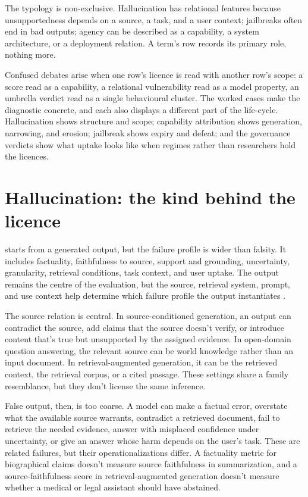 \documentclass[12pt]{article}
\begin{document}
The typology is non-exclusive. Hallucination has relational features because
unsupportedness depends on a source, a task, and a user context; jailbreaks
often end in bad outputs; agency can be described as a capability, a system
architecture, or a deployment relation. A term's row records its primary role,
nothing more.

Confused debates arise when one row's licence is read with another row's
scope: a score read as a capability, a relational vulnerability read as a model
property, an umbrella verdict read as a single behavioural cluster. The worked
cases make the diagnostic concrete, and each also displays a different part of
the life-cycle. Hallucination shows structure and scope; capability
attribution shows generation, narrowing, and erosion; jailbreak shows expiry
and defeat; and
the governance verdicts show what uptake looks like when regimes rather than
researchers hold the licences.

\section{Hallucination: the kind behind the licence}\label{sec:hallucination}

 starts from a generated output, but the failure profile is
wider than falsity. It includes factuality, faithfulness to source, support and
grounding, uncertainty, granularity, retrieval conditions, task context, and user
uptake. The output remains the centre of the evaluation, but the source,
retrieval system, prompt, and use context help determine which failure profile the
output instantiates \citep{ji2023survey,huang2025survey}.

The source relation is central. In source-conditioned generation, an output can
contradict the source, add claims that the source doesn't verify, or introduce
content that's true but unsupported by the assigned evidence. In open-domain
question answering, the relevant source can be world knowledge rather than an
input document. In retrieval-augmented generation, it can be the retrieved
context, the retrieval corpus, or a cited passage. These settings share a family
resemblance, but they don't license the same inference.

False output, then, is too coarse. A model can make a factual error,
overstate what the available source warrants, contradict a retrieved document,
fail to retrieve the needed evidence, answer with misplaced confidence under
uncertainty, or give an answer whose harm depends on the user's task. These are
related failures, but their operationalizations differ. A factuality metric for
biographical claims doesn't measure source faithfulness in summarization, and a
source-faithfulness score in retrieval-augmented generation doesn't measure
whether a medical or legal assistant should have abstained.
\end{document}
